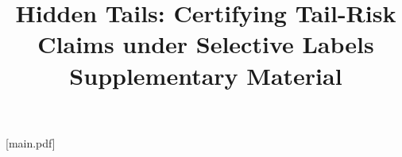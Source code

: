 
[main.pdf]
\title{Hidden Tails: Certifying Tail-Risk Claims under Selective Labels\\Supplementary Material}


\maketitle


\clearpage
\appendix
{}
\makeatletter
\let\c@lemma\c@theorem
\let\c@proposition\c@theorem
\let\c@corollary\c@theorem
\let\c@definition\c@theorem
\let\c@example\c@theorem
\let\c@remark\c@theorem
\makeatother
\renewcommand{\thelemma}{\thetheorem}
\renewcommand{\theproposition}{\thetheorem}
\renewcommand{\thecorollary}{\thetheorem}
\renewcommand{\thedefinition}{\thetheorem}
\renewcommand{\theexample}{\thetheorem}
\renewcommand{\theremark}{\thetheorem}
\renewcommand{\theHlemma}{\theHtheorem}
\renewcommand{\theHproposition}{\theHtheorem}
\renewcommand{\theHcorollary}{\theHtheorem}
\renewcommand{\theHdefinition}{\theHtheorem}
\renewcommand{\theHexample}{\theHtheorem}
\renewcommand{\theHremark}{\theHtheorem}
\setcounter{figure}{4}
\allowdisplaybreaks[2]






\FloatBarrier
\clearpage

\FloatBarrier
\clearpage



